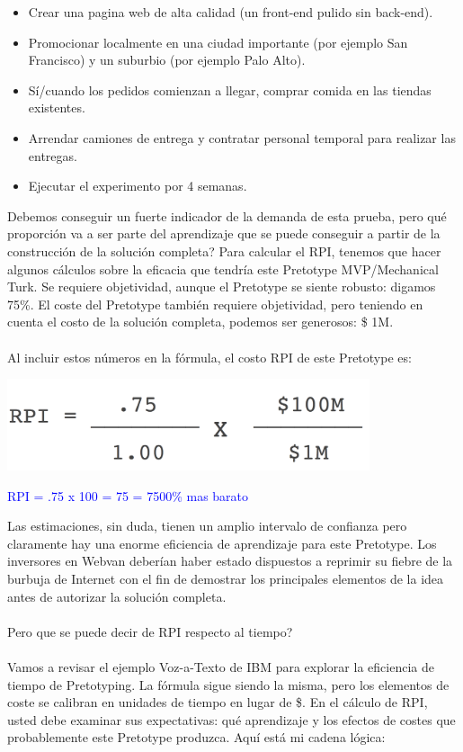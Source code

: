 \documentclass{article}
\begin{document}
\begin{itemize}

\item Crear una pagina web de alta calidad (un front-end pulido sin back-end).
\item Promocionar localmente en una ciudad importante (por ejemplo San Francisco) y un suburbio (por ejemplo Palo Alto).
\item S\'i/cuando los pedidos comienzan a llegar, comprar comida en las tiendas existentes.
\item Arrendar camiones de entrega y contratar personal temporal para realizar las entregas.
\item Ejecutar el experimento por 4 semanas.

\end{itemize}

Debemos conseguir un fuerte indicador de la demanda de esta prueba, pero qu\'e proporci\'on va a ser parte del aprendizaje que se puede conseguir a partir de la construcci\'on de la soluci\'on completa? Para calcular el RPI, tenemos que hacer algunos c\'alculos sobre la eficacia que tendr\'ia este Pretotype MVP/Mechanical Turk. Se requiere objetividad, aunque el Pretotype se siente robusto: digamos 75\%. El coste del Pretotype tambi\'en requiere objetividad, pero teniendo en cuenta el costo de la soluci\'on completa, podemos ser generosos: \$ 1M.
\\ \\
Al incluir estos n\'umeros en la f\'ormula, el costo RPI de este Pretotype es:

\begin{center}
    \includegraphics[width=0.8\textwidth]{test_RPI}
\end{center}

\begin{center}
\textcolor{blue}{\large RPI = .75 x 100 = 75 = 7500\% mas barato}
\end{center}

Las estimaciones, sin duda, tienen un amplio intervalo de confianza pero claramente hay una enorme eficiencia de aprendizaje para este Pretotype. Los inversores en Webvan deber\'ian haber estado dispuestos a reprimir su fiebre de la burbuja de Internet con el fin de demostrar los principales elementos de la idea antes de autorizar la soluci\'on completa.
\\ \\
Pero que se puede decir de RPI respecto al tiempo?
\\ \\
Vamos a revisar el ejemplo Voz-a-Texto de IBM para explorar la eficiencia de tiempo de Pretotyping. La f\'ormula sigue siendo la misma, pero los elementos de coste se calibran en unidades de tiempo en lugar de \$. En el c\'alculo de RPI, usted debe examinar sus expectativas: qu\'e aprendizaje y los efectos de costes que probablemente este Pretotype produzca. Aqu\'i est\'a mi cadena l\'ogica:
\end{document}
